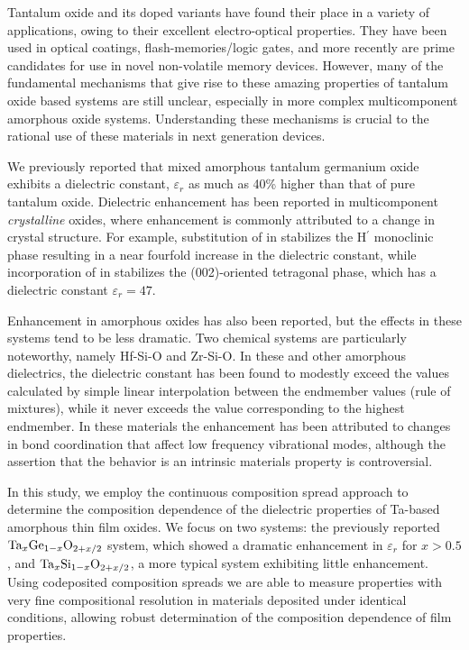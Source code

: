 \documentclass[aip,jap,numerical,citeautoscript,preprint]{revtex4-1}
\begin{document}
Tantalum oxide and its doped variants have found their place in a variety of applications, owing to their excellent electro-optical properties.\cite{CHANELIERE1998269} They have been used in optical coatings\cite{Harry2002}, flash-memories/logic gates,\cite{Kingon2000} and more recently are prime candidates for use in novel non-volatile memory devices.\cite{Lee2011} However, many of the fundamental mechanisms that give rise to these amazing properties of tantalum oxide based systems are still unclear, especially in more complex multicomponent amorphous oxide systems. Understanding these mechanisms is crucial to the rational use of these materials in next generation devices.

We previously reported that mixed amorphous tantalum germanium oxide exhibits a dielectric constant, $\varepsilon_{r}$ as much as 40\% higher than that of pure tantalum oxide. \cite{Naoi2012} Dielectric enhancement has been reported in multicomponent \textit{crystalline} oxides, where enhancement is commonly attributed to a change in crystal structure. For example, substitution of  in  stabilizes the H$^{\prime}$ monoclinic phase resulting in a near fourfold increase in the dielectric constant, \cite{Cava1995} while incorporation of  in  stabilizes the (002)-oriented tetragonal phase, which has a dielectric constant $\varepsilon_{r} =47$. \cite{Park2006a} 

Enhancement in amorphous oxides has also been reported, but the effects in these systems tend to be less dramatic. Two chemical systems are particularly noteworthy, namely Hf-Si-O and Zr-Si-O. In these and other amorphous dielectrics, the dielectric constant has been found to modestly exceed the values calculated by simple linear interpolation  between the endmember values (rule of mixtures), while it never exceeds the value corresponding to the highest endmember. \cite{Wilk2000a} In these materials the enhancement has been attributed to changes in bond coordination that affect low frequency vibrational modes, although the assertion that the behavior is an intrinsic materials property is controversial. \cite{Lucovsky2000, Rignanese2002, Pignedoli2007}  

In this study, we employ the continuous composition spread approach to determine the composition dependence of the dielectric properties of Ta-based amorphous thin film oxides. We focus on two systems: the previously reported $\textnormal{Ta}_{x}\textnormal{Ge}_{1-x}\textnormal{O}_{2+x/2}$ system, which showed a dramatic enhancement in $\varepsilon_{r}$ for $x > 0.5$, and  $\textnormal{Ta}_{x}\textnormal{Si}_{1-x}\textnormal{O}_{2+x/2}$, a more typical system exhibiting little enhancement. Using codeposited composition spreads\cite{VanDover2004} we are able to measure properties with very fine compositional resolution in materials deposited under identical conditions, allowing robust determination of the composition dependence of film properties. 
	
\end{document}

